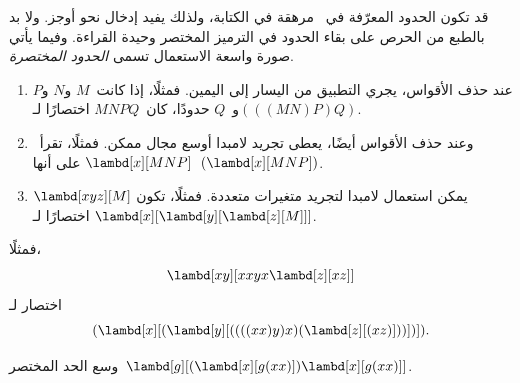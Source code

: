 \documentclass[../../../include/open-logic-section]{subfiles}
\begin{document}

قد تكون الحدود المعرّفة في~ مرهقة في الكتابة، ولذلك
يفيد إدخال نحو أوجز. ولا بد بالطبع من الحرص على بقاء الحدود في الترميز
المختصر وحيدة القراءة. وفيما يأتي صورة واسعة الاستعمال تسمى
\emph{الحدود المختصرة}.

\begin{enumerate}
\item عند حذف الأقواس، يجري التطبيق من اليسار إلى اليمين. فمثلًا، إذا
  كانت~$M$ و$N$ و$P$ و~$Q$ حدودًا، كان~$MNPQ$ اختصارًا لـ$(((MN)P)Q)$.
\item وعند حذف الأقواس أيضًا، يعطى تجريد لامبدا أوسع مجال ممكن. فمثلًا،
  تقرأ~$\lambd[x][MNP]$ على أنها~$(\lambd[x][MNP])$.
\item يمكن استعمال لامبدا لتجريد متغيرات متعددة. فمثلًا، تكون
  $\lambd[xyz][M]$ اختصارًا لـ
  $\lambd[x][\lambd[y][\lambd[z][M]]]$.
\end{enumerate}

فمثلًا،
\[
\lambd[xy][xxyx \lambd[z][xz]]
\]
اختصار لـ
\[
(\lambd[x][(\lambd[y][((((xx)y)x)(\lambd[z][(xz)]))])]).
\]

\begin{prob}
وسع الحد المختصر~$\lambd[g][(\lambd[x][g (x x)])
  \lambd[x][g (x x)]]$.
\end{prob}
\end{document}
